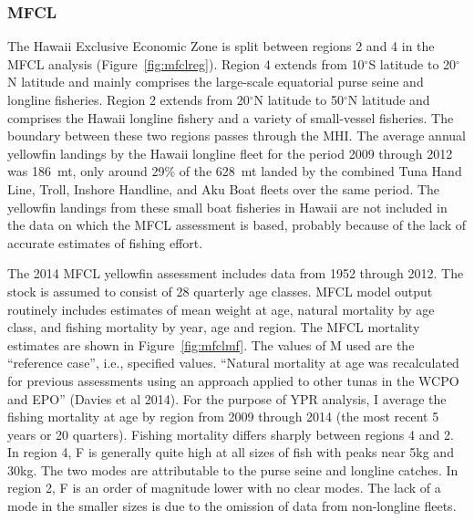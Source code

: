 \documentclass[12pt,letterpaper,twoside]{article}
\renewcommand\deg[1]{$^\circ$#1}
\newcommand\help[1]{\color{Magenta}{\it #1 }\normalcolor}
\begin{document}
\subsubsection*{MFCL}
The Hawaii Exclusive Economic Zone is split between regions 2 and 4
in the MFCL analysis (Figure~\ref{fig:mfclreg}). 
Region 4 extends from
10\deg{S} latitude to 20\deg{N} latitude and mainly comprises 
the large-scale equatorial purse seine and longline fisheries.
Region 2 extends from 20\deg{N} latitude to 50\deg{N} latitude
and comprises the Hawaii longline fishery and a variety of
small-vessel fisheries.
The boundary between these two regions passes through the MHI. 
The average annual yellowfin landings by the Hawaii longline fleet for
the period 2009 through 2012 was 186~mt, only around 29\% of the
628~mt landed by the combined Tuna Hand Line, Troll, Inshore Handline, and Aku
Boat fleets over the same period.
The yellowfin landings from these small boat fisheries in Hawaii are not
included in the data on which the MFCL assessment is based, probably
because of the lack of accurate estimates of fishing effort.



The 2014 MFCL yellowfin assessment includes data from 1952 through
2012. The stock is assumed to consist of 28 quarterly age classes. 
MFCL model output routinely includes estimates of mean weight at age,
natural mortality by age class, and fishing mortality by year, age
and region. 
The MFCL mortality estimates are shown in Figure~\ref{fig:mfclmf}. 
The values of M used are the ``reference case'', i.e.,
specified values.
``Natural mortality at age was recalculated for previous assessments
using an approach applied to other tunas in the WCPO and EPO'' 
(Davies et al 2014).
For the purpose of YPR analysis, I average the fishing
mortality at age by region from 2009 through 2014 (the most recent 5
years or 20 quarters). 
Fishing mortality differs sharply between regions 4 and 2. In region
4, F is generally quite high at all sizes of fish with peaks near 5kg
and 30kg. The two modes are attributable to the purse seine and
longline catches.
In region 2, F is an order of magnitude lower with no clear
modes. The lack of a mode in the smaller sizes is due to the omission
of data from non-longline fleets.
\end{document}
